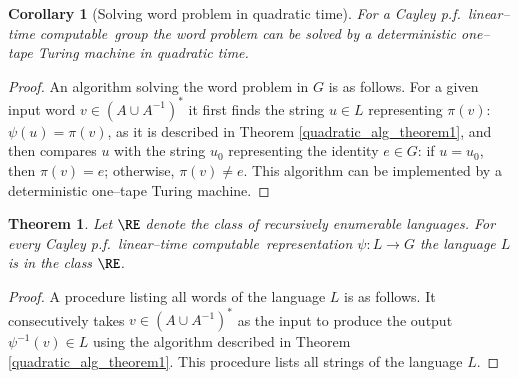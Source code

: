 \documentclass[article,12pt]{elsarticle}
\newtheorem{theorem}{Theorem}
\newtheorem{corollary}{Corollary}
\newcommand\linearC{Cayley p.f.~linear--time computable}
\begin{document}
\begin{corollary}[Solving word problem in quadratic time] 
	\label{quasiCayleywordproblem}	
	For a \linearC\ group
	the word problem can be solved  
	by a deterministic  one--tape Turing machine
	in quadratic time.  	 
\end{corollary}
\begin{proof}
	An algorithm solving the word problem in $G$ 
	is as follows.   
	For a given input word $v \in (A \cup A^{-1})^*$  
	it first finds the string $u \in L$ 
	representing $\pi(v)$: $\psi(u) = \pi (v)$, as 
	it is described in Theorem \ref{quadratic_alg_theorem1},  and then compares $u$ with the string $u_0$ representing 
	the identity $e \in G$: if $u = u_0$, then 
	$\pi(v) = e$; otherwise, $\pi(v) \neq e$.  
	This algorithm can be implemented by a deterministic 
	one--tape Turing machine. 
\end{proof}

\begin{theorem} 
	\label{L_recursivelyenumerable_quasiautomatic}	
	Let $\RE$ denote the class of recursively 
	enumerable languages. 
	For every \linearC\ representation 
	$\psi: L \rightarrow  G$ the language 
	$L$ is in the class $\RE$. 
\end{theorem}
\begin{proof}	
	A procedure listing all words of the language 
	$L$ is as follows. It consecutively takes 
	$v \in (A \cup A^{-1})^*$  as the input to produce 
	the output $\psi^{-1}(v) \in L$ using the algorithm 
	described in Theorem \ref{quadratic_alg_theorem1}.
	This procedure lists all strings of the 
	language $L$. 
\end{proof}
\end{document}
